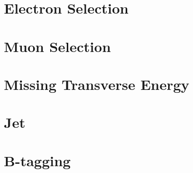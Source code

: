 \section{Electron Selection}

\section{Muon Selection}

\section{Missing Transverse Energy}

\section{Jet}

\section{B-tagging}
